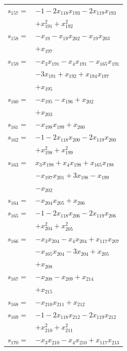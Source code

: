 \begin{longtable}{@{}r@{\;}l@{}}
\(s_{157}=\) & \(\displaystyle -1 -2x_{118}x_{193} -2x_{119}x_{193}\) \\
 & \(\displaystyle +x_{191}^{2} +x_{192}^{2}\) \\[3pt]
\(s_{158}=\) & \(\displaystyle -x_{19} -x_{19}x_{202} -x_{19}x_{203}\) \\
 & \(\displaystyle +x_{197}\) \\[3pt]
\(s_{159}=\) & \(\displaystyle -x_{3}x_{191} -x_{4}x_{191} -x_{165}x_{191}\) \\
 & \(\displaystyle -3x_{191} +x_{192} +x_{194}x_{197}\) \\
 & \(\displaystyle +x_{195}\) \\[3pt]
\(s_{160}=\) & \(\displaystyle -x_{195} -x_{196} +x_{202}\) \\
 & \(\displaystyle +x_{203}\) \\[3pt]
\(s_{161}=\) & \(\displaystyle -x_{198}x_{199} +x_{200}\) \\[3pt]
\(s_{162}=\) & \(\displaystyle -1 -2x_{118}x_{200} -2x_{119}x_{200}\) \\
 & \(\displaystyle +x_{198}^{2} +x_{199}^{2}\) \\[3pt]
\(s_{163}=\) & \(\displaystyle x_{3}x_{198} +x_{4}x_{198} +x_{165}x_{198}\) \\
 & \(\displaystyle -x_{197}x_{201} +3x_{198} -x_{199}\) \\
 & \(\displaystyle -x_{202}\) \\[3pt]
\(s_{164}=\) & \(\displaystyle -x_{204}x_{205} +x_{206}\) \\[3pt]
\(s_{165}=\) & \(\displaystyle -1 -2x_{118}x_{206} -2x_{119}x_{206}\) \\
 & \(\displaystyle +x_{204}^{2} +x_{205}^{2}\) \\[3pt]
\(s_{166}=\) & \(\displaystyle -x_{3}x_{204} -x_{4}x_{204} +x_{117}x_{207}\) \\
 & \(\displaystyle -x_{165}x_{204} -3x_{204} +x_{205}\) \\
 & \(\displaystyle +x_{208}\) \\[3pt]
\(s_{167}=\) & \(\displaystyle -x_{208} -x_{209} +x_{214}\) \\
 & \(\displaystyle +x_{215}\) \\[3pt]
\(s_{168}=\) & \(\displaystyle -x_{210}x_{211} +x_{212}\) \\[3pt]
\(s_{169}=\) & \(\displaystyle -1 -2x_{118}x_{212} -2x_{119}x_{212}\) \\
 & \(\displaystyle +x_{210}^{2} +x_{211}^{2}\) \\[3pt]
\(s_{170}=\) & \(\displaystyle -x_{3}x_{210} -x_{4}x_{210} +x_{117}x_{213}\) \\

\end{longtable}
